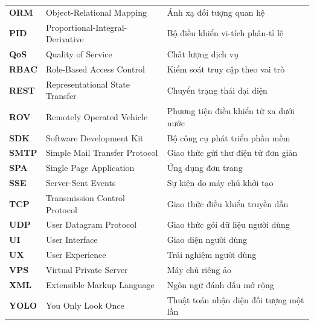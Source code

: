 \documentclass[../DoAn.tex]{subfiles}
\begin{document}
\begin{longtable}{l p{6.0cm} p{7.0cm}}
    \textbf{ORM}  & Object-Relational Mapping & Ánh xạ đối tượng quan hệ \\
    \textbf{PID}  & Proportional-Integral-Derivative & Bộ điều khiển vi-tích phân-tỉ lệ \\
    \textbf{QoS}  & Quality of Service & Chất lượng dịch vụ \\
    \textbf{RBAC} & Role-Based Access Control & Kiểm soát truy cập theo vai trò \\
    \textbf{REST} & Representational State Transfer & Chuyển trạng thái đại diện \\
    \textbf{ROV}  & Remotely Operated Vehicle & Phương tiện điều khiển từ xa dưới nước \\
    \textbf{SDK}  & Software Development Kit & Bộ công cụ phát triển phần mềm \\
    \textbf{SMTP} & Simple Mail Transfer Protocol & Giao thức gửi thư điện tử đơn giản \\
    \textbf{SPA}  & Single Page Application & Ứng dụng đơn trang \\
    \textbf{SSE}  & Server-Sent Events & Sự kiện do máy chủ khởi tạo \\
    \textbf{TCP}  & Transmission Control Protocol & Giao thức điều khiển truyền dẫn \\
    \textbf{UDP}  & User Datagram Protocol & Giao thức gói dữ liệu người dùng \\
    \textbf{UI}   & User Interface & Giao diện người dùng \\
    \textbf{UX}   & User Experience & Trải nghiệm người dùng \\
    \textbf{VPS}  & Virtual Private Server & Máy chủ riêng ảo \\
    \textbf{XML}  & Extensible Markup Language & Ngôn ngữ đánh dấu mở rộng \\
    \textbf{YOLO} & You Only Look Once & Thuật toán nhận diện đối tượng một lần \\ \hline
\end{longtable}
\end{document}
